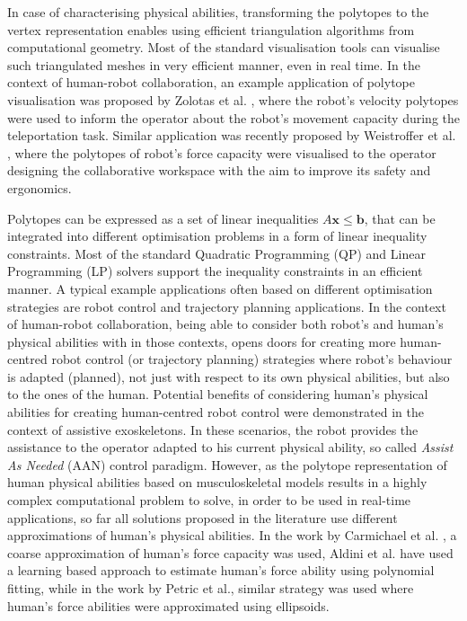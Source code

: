 In case of characterising physical abilities, transforming the polytopes to the vertex representation enables using efficient triangulation algorithms from computational geometry. Most of the standard visualisation tools can visualise such triangulated meshes in very efficient manner, even in real time. 
In the context of human-robot collaboration, an example application of polytope visualisation was proposed by Zolotas et al. \cite{Zolotas2021}, where the robot's velocity polytopes were used to inform the operator about the robot's movement capacity during the teleportation task. Similar application was recently proposed by Weistroffer et al. \cite{Weistroffer2022Using}, where the polytopes of robot's force capacity were visualised to the operator designing the collaborative workspace with the aim to improve its safety and ergonomics. 

Polytopes can be expressed as a set of linear inequalities $A\bm{x}\leq\bm{b}$, that can be integrated into different optimisation problems in a form of linear inequality constraints. Most of the standard Quadratic Programming (QP) \cite{boggs_tolle_1995} and Linear Programming (LP) \cite{GOLDFARB198973} solvers support the inequality constraints in an efficient manner. A typical example applications often based on different optimisation strategies are robot control and trajectory planning applications. In the context of human-robot collaboration, being able to consider both robot's and human's physical abilities with in those contexts, opens doors for creating more human-centred robot control (or trajectory planning) strategies where robot's behaviour is adapted (planned), not just with respect to its own physical abilities, but also to the ones of the human.
Potential benefits of considering human's physical abilities for creating human-centred robot control were demonstrated in the context of assistive exoskeletons. In these scenarios, the robot provides the assistance to the operator adapted to his current physical ability, so called \textit{Assist As Needed} (AAN)\cite{carmichael2013admittance} control paradigm.
However, as the polytope representation of human physical abilities based on musculoskeletal models results in a highly complex computational problem to solve, in order to be used in real-time applications, so far all solutions proposed in the literature use different approximations of human's physical abilities. In the work by Carmichael et al. \cite{carmichael_towards_2011}, a coarse approximation of human's force capacity was used, Aldini et al.\cite{Aldini2021RealTime} have used a learning based approach to estimate human's force ability using polynomial fitting, while in the work by Petric et al.\cite{petric2019assistive}, similar strategy was used where human's force abilities were approximated using ellipsoids.

